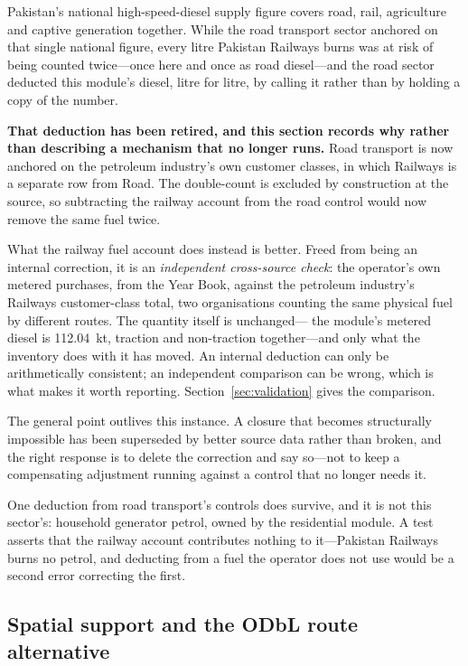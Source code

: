 Pakistan's national high-speed-diesel supply figure covers road, rail, agriculture and
captive generation together. While the road transport sector anchored on that single national
figure, every litre Pakistan Railways burns was at risk of being counted twice---once here and
once as road diesel---and the road sector deducted this module's diesel, litre for litre, by
calling it rather than by holding a copy of the number.

\textbf{That deduction has been retired, and this section records why rather than describing a
mechanism that no longer runs.} Road transport is now anchored on the petroleum industry's own
customer classes, in which Railways is a separate row from Road. The double-count is excluded
by construction at the source, so subtracting the railway account from the road control would
now remove the same fuel twice.

What the railway fuel account does instead is better. Freed from being an internal correction,
it is an \emph{independent cross-source check}: the operator's own metered purchases, from the
Year Book, against the petroleum industry's Railways customer-class total, two organisations
counting the same physical fuel by different routes. The quantity itself is unchanged---
the module's metered diesel is \SI{112.04}{\kilo\tonne}, traction and non-traction
together---and only what the inventory does with it has moved. An internal deduction can only be
arithmetically consistent; an independent comparison can be wrong, which is what makes it
worth reporting. Section~\ref{sec:validation} gives the comparison.

The general point outlives this instance. A closure that becomes structurally impossible has
been superseded by better source data rather than broken, and the right response is to delete
the correction and say so---not to keep a compensating adjustment running against a control
that no longer needs it.

One deduction from road transport's controls does survive, and it is not this sector's:
household generator petrol, owned by the residential module. A test asserts that the railway
account contributes nothing to it---Pakistan Railways burns no petrol, and deducting from a
fuel the operator does not use would be a second error correcting the first.

\subsection{Spatial support and the ODbL route alternative}
\label{sec:spatial}

